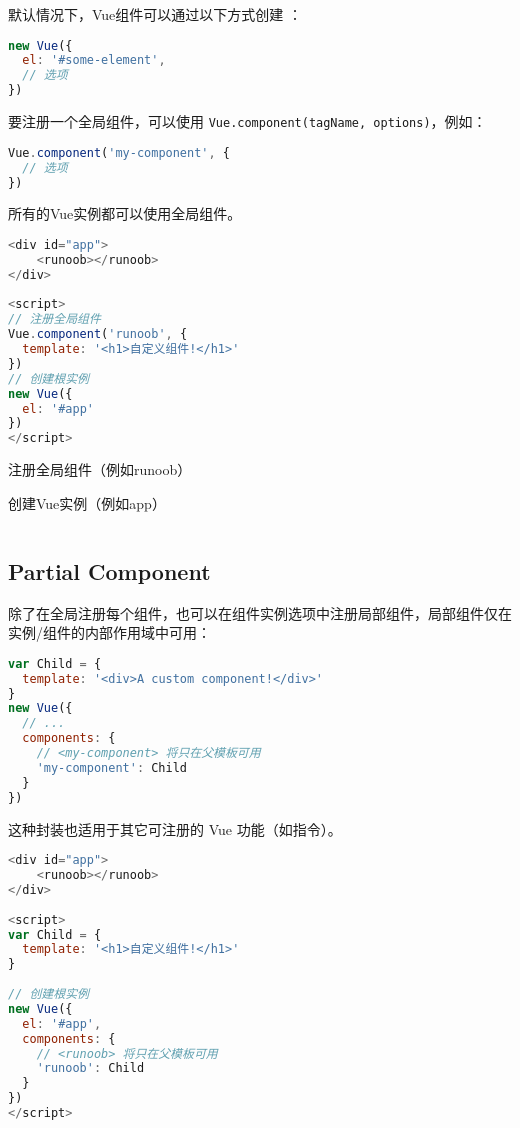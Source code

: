 默认情况下，Vue组件可以通过以下方式创建 ：


\begin{lstlisting}[language=JavaScript]
new Vue({
  el: '#some-element',
  // 选项
})
\end{lstlisting}

要注册一个全局组件，可以使用 \texttt{Vue.component(tagName, options)}，例如：

\begin{lstlisting}[language=JavaScript]
Vue.component('my-component', {
  // 选项
})
\end{lstlisting}


所有的Vue实例都可以使用全局组件。


\begin{lstlisting}[language=JavaScript]
<div id="app">
    <runoob></runoob>
</div>
 
<script>
// 注册全局组件
Vue.component('runoob', {
  template: '<h1>自定义组件!</h1>'
})
// 创建根实例
new Vue({
  el: '#app'
})
</script>
\end{lstlisting}

\begin{compactenum}
\item 注册全局组件（例如runoob）
\item 创建Vue实例（例如app）
\end{compactenum}


\begin{lstlisting}[language=JavaScript]

\end{lstlisting}





\subsection{Partial Component}

除了在全局注册每个组件，也可以在组件实例选项中注册局部组件，局部组件仅在实例/组件的内部作用域中可用：


\begin{lstlisting}[language=JavaScript]
var Child = {
  template: '<div>A custom component!</div>'
}
new Vue({
  // ...
  components: {
    // <my-component> 将只在父模板可用
    'my-component': Child
  }
})
\end{lstlisting}

这种封装也适用于其它可注册的 Vue 功能（如指令）。

\begin{lstlisting}[language=JavaScript]
<div id="app">
    <runoob></runoob>
</div>
 
<script>
var Child = {
  template: '<h1>自定义组件!</h1>'
}
 
// 创建根实例
new Vue({
  el: '#app',
  components: {
    // <runoob> 将只在父模板可用
    'runoob': Child
  }
})
</script>
\end{lstlisting}

